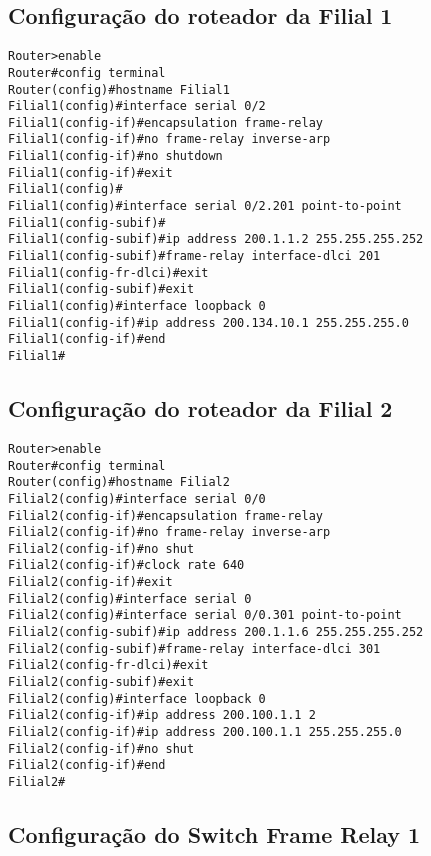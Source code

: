 \documentclass[]{article}
\begin{document}
\hypertarget{configurauxe7uxe3o-do-roteador-da-filial-1}{%
\subsection{Configuração do roteador da Filial
1}\label{configurauxe7uxe3o-do-roteador-da-filial-1}}

\begin{verbatim}
Router>enable
Router#config terminal
Router(config)#hostname Filial1
Filial1(config)#interface serial 0/2
Filial1(config-if)#encapsulation frame-relay
Filial1(config-if)#no frame-relay inverse-arp
Filial1(config-if)#no shutdown
Filial1(config-if)#exit
Filial1(config)#
Filial1(config)#interface serial 0/2.201 point-to-point
Filial1(config-subif)#
Filial1(config-subif)#ip address 200.1.1.2 255.255.255.252
Filial1(config-subif)#frame-relay interface-dlci 201
Filial1(config-fr-dlci)#exit
Filial1(config-subif)#exit
Filial1(config)#interface loopback 0
Filial1(config-if)#ip address 200.134.10.1 255.255.255.0
Filial1(config-if)#end
Filial1#
\end{verbatim}

\hypertarget{configurauxe7uxe3o-do-roteador-da-filial-2}{%
\subsection{Configuração do roteador da Filial
2}\label{configurauxe7uxe3o-do-roteador-da-filial-2}}

\begin{verbatim}
Router>enable
Router#config terminal
Router(config)#hostname Filial2
Filial2(config)#interface serial 0/0
Filial2(config-if)#encapsulation frame-relay
Filial2(config-if)#no frame-relay inverse-arp
Filial2(config-if)#no shut
Filial2(config-if)#clock rate 640
Filial2(config-if)#exit
Filial2(config)#interface serial 0
Filial2(config)#interface serial 0/0.301 point-to-point
Filial2(config-subif)#ip address 200.1.1.6 255.255.255.252
Filial2(config-subif)#frame-relay interface-dlci 301
Filial2(config-fr-dlci)#exit
Filial2(config-subif)#exit
Filial2(config)#interface loopback 0
Filial2(config-if)#ip address 200.100.1.1 2
Filial2(config-if)#ip address 200.100.1.1 255.255.255.0
Filial2(config-if)#no shut
Filial2(config-if)#end
Filial2#
\end{verbatim}

\hypertarget{configurauxe7uxe3o-do-switch-frame-relay-1}{%
\subsection{Configuração do Switch Frame Relay
1}\label{configurauxe7uxe3o-do-switch-frame-relay-1}}
\end{document}
